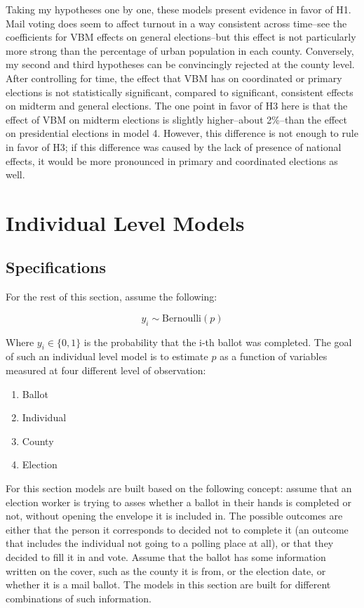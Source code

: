 \documentclass[12pt,twoside]{reedthesis}
\begin{document}
  Taking my hypotheses one by one, these models present evidence in favor
  of H1. Mail voting does seem to affect turnout in a way consistent
  across time--see the coefficients for VBM effects on general
  elections--but this effect is not particularly more strong than the
  percentage of urban population in each county. Conversely, my second and
  third hypotheses can be convincingly rejected at the county level. After
  controlling for time, the effect that VBM has on coordinated or primary
  elections is not statistically significant, compared to significant,
  consistent effects on midterm and general elections. The one point in
  favor of H3 here is that the effect of VBM on midterm elections is
  slightly higher--about 2\%--than the effect on presidential elections in
  model 4. However, this difference is not enough to rule in favor of H3;
  if this difference was caused by the lack of presence of national
  effects, it would be more pronounced in primary and coordinated
  elections as well.
  
  \section{Individual Level Models}\label{individual-level-models}
  
  \subsection{Specifications}\label{specifications-1}
  
  For the rest of this section, assume the following:
  
  \[y_i \sim \text{Bernoulli}(p)\]
  
  Where \(y_i \in \{0,1\}\) is the probability that the i-th ballot was
  completed. The goal of such an individual level model is to estimate
  \(p\) as a function of variables measured at four different level of
  observation:
  
  \begin{enumerate}
     \item Ballot
     \item Individual
     \item County
     \item Election
  \end{enumerate}
  
  For this section models are built based on the following concept: assume
  that an election worker is trying to asses whether a ballot in their
  hands is completed or not, without opening the envelope it is included
  in. The possible outcomes are either that the person it corresponds to
  decided not to complete it (an outcome that includes the individual not
  going to a polling place at all), or that they decided to fill it in and
  vote. Assume that the ballot has some information written on the cover,
  such as the county it is from, or the election date, or whether it is a
  mail ballot. The models in this section are built for different
  combinations of such information.
  
\end{document}
